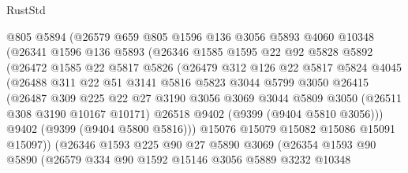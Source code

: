 \begin{lexlean}{RustStd}
\begin{coremodule}
              @805
              @5894
              (@26579
                @659
                @805
                @1596
                @136
                @3056
                @5893
                @4060
                @10348
                (@26341
                  @1596
                  @136
                  @5893
                  (@26346
                    @1585
                    @1595
                    @22
                    @92
                    @5828
                    @5892
                    (@26472
                      @1585
                      @22
                      @5817
                      @5826
                      (@26479
                        @312
                        @126
                        @22
                        @5817
                        @5824
                        @4045
                        (@26488
                          @311
                          @22
                          @51
                          @3141
                          @5816
                          @5823
                          @3044
                          @5799
                          @3050
                          @26415
                          (@26487
                            @309
                            @225
                            @22
                            @27
                            @3190
                            @3056
                            @3069
                            @3044
                            @5809
                            @3050
                            (@26511 @308 @3190 @10167 @10171)
                            @26518
                            @9402
                            (@9399 (@9404 @5810 @3056)))
                          @9402
                          (@9399 (@9404 @5800 @5816)))
                        @15076
                        @15079
                        @15082
                        @15086
                        @15091
                        @15097))
                    (@26346
                      @1593
                      @225
                      @90
                      @27
                      @5890
                      @3069
                      (@26354
                        @1593
                        @90
                        @5890
                        (@26579
                          @334
                          @90
                          @1592
                          @15146
                          @3056
                          @5889
                          @3232
                          @10348

\end{coremodule}
\end{lexlean}
